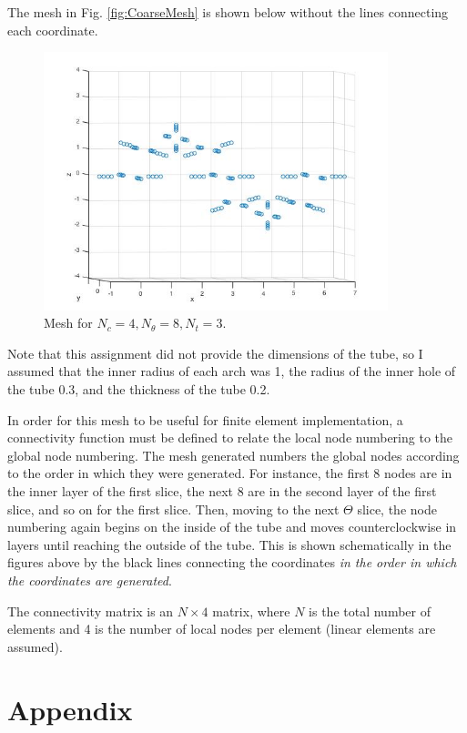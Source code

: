 \documentclass[10pt]{article}
\begin{document}
The mesh in Fig. \ref{fig:CoarseMesh} is shown below without the lines connecting each coordinate.

\begin{figure}[H]
  \centering
  \includegraphics[width=10cm]{CoarseMeshNoLines.jpg}
  \caption{Mesh for \(N_c=4, N_\theta=8, N_t=3\).}
\end{figure}

Note that this assignment did not provide the dimensions of the tube, so I assumed that the inner radius of each arch was 1, the radius of the inner hole of the tube 0.3, and the thickness of the tube 0.2.

In order for this mesh to be useful for finite element implementation, a connectivity function must be defined to relate the local node numbering to the global node numbering. The mesh generated numbers the global nodes according to the order in which they were generated. For instance, the first 8 nodes are in the inner layer of the first slice, the next 8 are in the second layer of the first slice, and so on for the first slice. Then, moving to the next \(\Theta\) slice, the node numbering again begins on the inside of the tube and moves counterclockwise in layers until reaching the outside of the tube. This is shown schematically in the figures above by the black lines connecting the coordinates \textit{in the order in which the coordinates are generated}.

The connectivity matrix is an \(N\times4\) matrix, where \(N\) is the total number of elements and 4 is the number of local nodes per element (linear elements are assumed). 

\section{Appendix}
\end{document}

